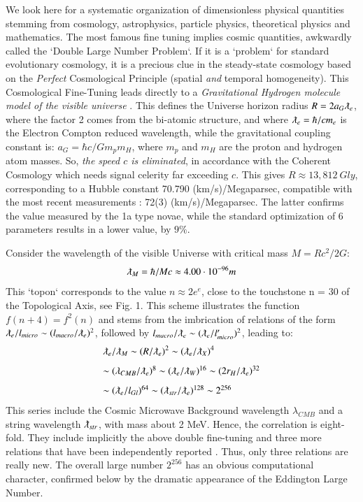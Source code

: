 \documentclass[twoside,draft]{article}
\begin{document}
\begin{sloppypar}
We look here for a systematic organization of dimensionless physical quantities stemming from cosmology, astrophysics, particle   physics, theoretical physics and mathematics. The most famous fine tuning implies cosmic quantities, awkwardly called the `Double Large Number Problem`. If it is a `problem` for standard evolutionary cosmology, it is a precious clue in the steady-state cosmology based on the \textit{Perfect} Cosmological Principle (spatial \textit{and} temporal homogeneity).
This Cosmological Fine-Tuning leads directly to a \textit{Gravitational Hydrogen molecule model of the visible universe} \cite{Sanchez1}.
This defines the Universe horizon radius $R = 2a_{G} \lambdabar_{e}$, where the factor 2 comes from the bi-atomic structure, and where $\lambdabar_{e} = \hbar/cm_{e}$ is the Electron Compton reduced wavelength, while the gravitational coupling constant is: $a_{G} = \hbar c/Gm_{p}m_{H}$, where $m_p$ and $m_H$ are the proton and hydrogen atom masses. So, \textit{the speed $c$ is eliminated}, in accordance with the Coherent Cosmology which needs signal celerity far exceeding $c$. This gives $R \approx 13,812~Gly $, corresponding to a Hubble constant 70.790 (km/s)/Megaparsec, compatible with the most recent measurements \cite{Bonvin}: 72(3) (km/s)/Megaparsec. The latter confirms the value measured by the 1a type novae, while the standard optimization of 6 parameters results in a lower value, by $9\%$.

Consider the wavelength of the visible Universe with critical mass $M= Rc^2/2G$: $$\lambdabar_{M} = \hbar /Mc \approx 4.00 \cdot 10^{-96} m$$ This `topon` corresponds to the value $n \approx 2e^e$, close to the touchstone n = 30 of the Topological Axis, see Fig. 1. This scheme illustrates the function $f(n + 4) = f^{2}(n)$
and stems from the imbrication of relations of the form $\lambdabar_{e} /l_{micro} \sim (l_{macro} /\lambdabar_{e})^{2}$, followed by $ l_{macro} /\lambdabar_{e} \sim (\lambdabar_{e} /l^{\prime}_{micro} )^{2}$, leading to:
$$
\begin{array}{ll}
%
\displaystyle
\lambdabar_{e}/\lambdabar_{M} \sim (R/\lambdabar_{e})^{2} \sim (\lambdabar_{e}/ \lambdabar_{X})^{4}\\[+8pt]  %
\sim (\lambda_{CMB}/ \lambdabar_{e})^{8} \sim (\lambdabar_{e}/\lambdabar_{W})^{16} \sim (2r_{H} /\lambdabar_{e})^{32}\\[+8pt] %
\sim (\lambdabar_{e}/ l_{Gl} )^{64} \sim (\lambdabar_{str} /\lambdabar_{e} )^{128} \sim 2^{256}\\ %
\end{array}
$$
This series include the Cosmic Microwave Background wavelength $\lambda_{CMB}$ and a string wavelength $\lambdabar_{str}$, with mass about 2 MeV. Hence, the correlation is eight-fold. They include implicitly the above double fine-tuning and three  more relations that have been independently reported \cite{Sanchez1}. Thus, only three relations are really new. The overall large number $2^{256}$ has an obvious computational character, confirmed below by the dramatic appearance of the Eddington Large Number.


\end{sloppypar}
\end{document}
